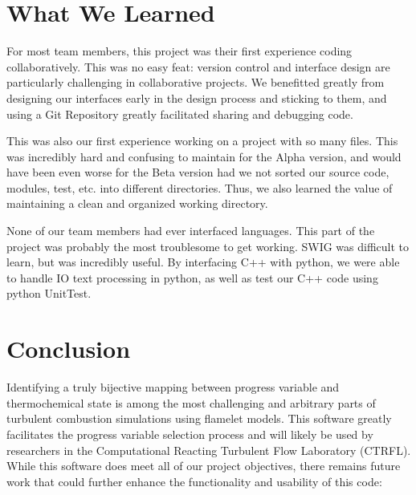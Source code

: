 \documentclass[11pt]{article}
\begin{document}

\section{What We Learned}
For most team members, this project was their first experience coding collaboratively. This was no easy feat: version control and interface design are particularly challenging in collaborative projects. We benefitted greatly from designing our interfaces early in the design process and sticking to them, and using a Git Repository greatly facilitated sharing and debugging code.

This was also our first experience working on a project with so many files. This was incredibly hard and confusing to maintain for the Alpha version, and would have been even worse for the Beta version had we not sorted our source code, modules, test, etc. into different directories. Thus, we also learned the value of maintaining a clean and organized working directory.

None of our team members had ever interfaced languages. This part of the project was probably the most troublesome to get working. SWIG was difficult to learn, but was incredibly useful. By interfacing C++ with python, we were able to handle IO text processing in python, as well as test our C++ code using python UnitTest.

\section{Conclusion}
Identifying a truly bijective mapping between progress variable and thermochemical state is among the most challenging and arbitrary parts of turbulent combustion simulations using flamelet models. This software greatly facilitates the progress variable selection process and will likely be used by researchers in the Computational Reacting Turbulent Flow Laboratory (CTRFL). While this software does meet all of our project objectives, there remains future work that could further enhance the functionality and usability of this code:
\end{document}
